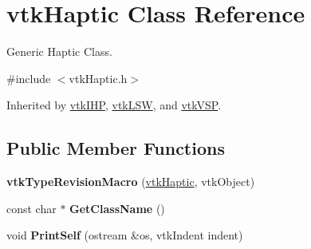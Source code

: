 \hypertarget{classvtkHaptic}{
\section{vtkHaptic Class Reference}
\label{classvtkHaptic}
}


Generic Haptic Class.  


{\ttfamily \#include $<$vtkHaptic.h$>$}

Inherited by \hyperlink{classvtkIHP}{vtkIHP}, \hyperlink{classvtkLSW}{vtkLSW}, and \hyperlink{classvtkVSP}{vtkVSP}.\subsection*{Public Member Functions}
\begin{DoxyCompactItemize}
\item 
\hypertarget{classvtkHaptic_ae3394196586f112adfd8196a15b1df4a}{
{\bfseries vtkTypeRevisionMacro} (\hyperlink{classvtkHaptic}{vtkHaptic}, vtkObject)}
\label{classvtkHaptic_ae3394196586f112adfd8196a15b1df4a}

\item 
\hypertarget{classvtkHaptic_a0ca1c58149ad2218a07663d4f0b95582}{
const char $\ast$ {\bfseries GetClassName} ()}
\label{classvtkHaptic_a0ca1c58149ad2218a07663d4f0b95582}

\item 
\hypertarget{classvtkHaptic_aa091582526f7b7197a91bee363a04359}{
void {\bfseries PrintSelf} (ostream \&os, vtkIndent indent)}
\label{classvtkHaptic_aa091582526f7b7197a91bee363a04359}


\end{DoxyCompactItemize}
